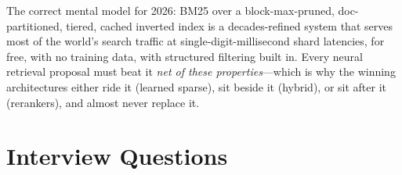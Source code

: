 \begin{keyinsight}
The correct mental model for 2026: BM25 over a block-max-pruned, doc-partitioned, tiered, cached inverted index is a decades-refined system that serves most of the world's search traffic at single-digit-millisecond shard latencies, for free, with no training data, with structured filtering built in. Every neural retrieval proposal must beat it \emph{net of these properties}---which is why the winning architectures either ride it (learned sparse), sit beside it (hybrid), or sit after it (rerankers), and almost never replace it.
\end{keyinsight}

\section{Interview Questions}
\label{sr:sec:lexical_interview}

